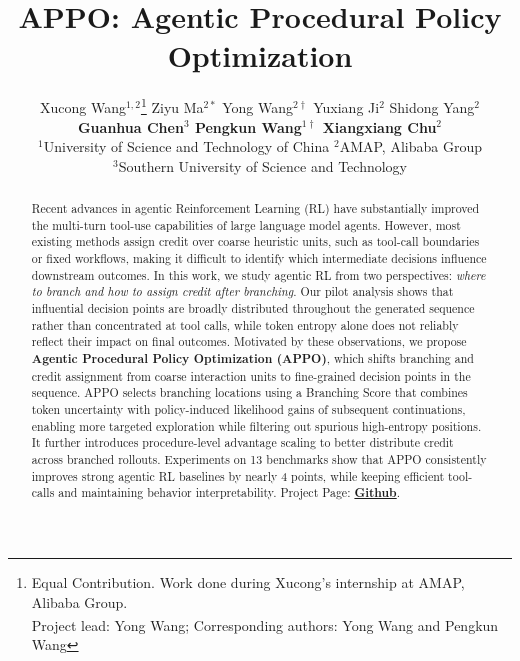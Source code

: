 \documentclass{article}
\title{APPO: Agentic Procedural Policy Optimization}
\author{%
  Xucong Wang$^{1,2}$\thanks{\parbox[t]{0.85\linewidth}{%
    Equal Contribution. Work done during Xucong's internship at AMAP, Alibaba Group. \\ \textsuperscript{\textdagger}Project lead: Yong Wang; Corresponding authors: Yong Wang and Pengkun Wang}}\quad 
  Ziyu Ma$^{2*}$\quad 
  Yong Wang$^{2\dagger}$\quad 
  Yuxiang Ji$^{2}$\quad 
  Shidong Yang$^{2}$\quad \\ 
  \textbf{Guanhua Chen$^{3}$\quad   
  Pengkun Wang$^{1\dagger}$\quad 
  Xiangxiang Chu$^{2}$}\\
  $^1$University of Science and Technology of China 
  $^2$AMAP, Alibaba Group \\
  $^3$Southern University of Science and Technology
}
\begin{document}
\maketitle


\begin{abstract}
Recent advances in agentic Reinforcement Learning (RL) have substantially improved the multi-turn tool-use capabilities of large language model agents. However, most existing methods assign credit over coarse heuristic units, such as tool-call boundaries or fixed workflows, making it difficult to identify which intermediate decisions influence downstream outcomes. In this work, we study agentic RL from two perspectives: \textit{where to branch and how to assign credit after branching}. Our pilot analysis shows that influential decision points are broadly distributed throughout the generated sequence rather than concentrated at tool calls, while token entropy alone does not reliably reflect their impact on final outcomes. Motivated by these observations, we propose \textbf{Agentic Procedural Policy Optimization (APPO)}, which shifts branching and credit assignment from coarse interaction units to fine-grained decision points in the sequence. APPO selects branching locations using a Branching Score that combines token uncertainty with policy-induced likelihood gains of subsequent continuations, enabling more targeted exploration while filtering out spurious high-entropy positions. It further introduces procedure-level advantage scaling to better distribute credit across branched rollouts. Experiments on 13 benchmarks show that APPO consistently improves strong agentic RL baselines by nearly 4 points, while keeping efficient tool-calls and maintaining behavior interpretability. Project Page: \href{https://github.com/AMAP-ML/APPO}{\textbf{Github}}. 
\end{abstract}  
\end{document}
